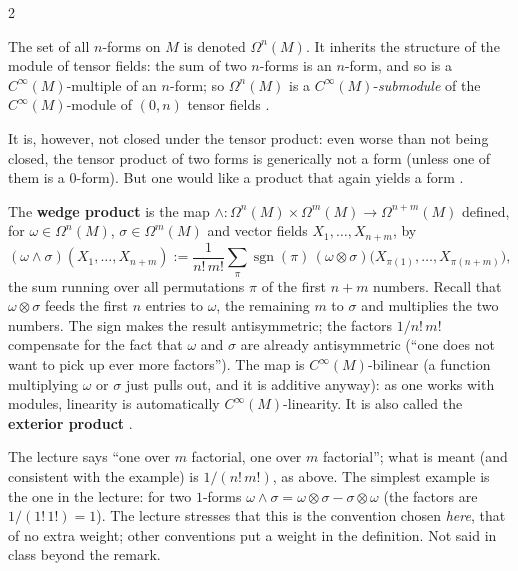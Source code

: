 \begin{paracol}{2}
\begin{definition}\label{def:gr-omega-n}
The set of all $n$-forms on $M$ is denoted $\Omega^n(M)$. It inherits the structure of the module of tensor fields: the sum of two $n$-forms is an $n$-form, and so is a $C^\infty(M)$-multiple of an $n$-form; so $\Omega^n(M)$ is a $C^\infty(M)$-\emph{submodule} of the $C^\infty(M)$-module of $(0,n)$ tensor fields     .
\end{definition}
It is, however, not closed under the tensor product: even worse than not being closed, the tensor product of two forms is generically not a form (unless one of them is a $0$-form). But one would like a product that again yields a form   .

\begin{definition}\label{def:gr-wedge}
The \textbf{wedge product} is the map $\wedge\colon\Omega^n(M)\times\Omega^m(M)\to\Omega^{n+m}(M)$ defined, for $\omega\in\Omega^n(M)$, $\sigma\in\Omega^m(M)$ and vector fields $X_1,\dots,X_{n+m}$, by
\[
  (\omega\wedge\sigma)(X_1,\dots,X_{n+m}):=\frac1{n!\,m!}\sum_{\pi}\operatorname{sgn}(\pi)\,(\omega\otimes\sigma)\bigl(X_{\pi(1)},\dots,X_{\pi(n+m)}\bigr),
\]
the sum running over all permutations $\pi$ of the first $n+m$ numbers. Recall that $\omega\otimes\sigma$ feeds the first $n$ entries to $\omega$, the remaining $m$ to $\sigma$ and multiplies the two numbers. The sign makes the result antisymmetric; the factors $1/n!\,m!$ compensate for the fact that $\omega$ and $\sigma$
are already antisymmetric (``one does not want to pick up ever more factors''). The map is $C^\infty(M)$-bilinear (a function multiplying $\omega$ or $\sigma$ just pulls out, and it is additive anyway): as one works with modules, linearity is automatically $C^\infty(M)$-linearity. It is also called the \textbf{exterior product}           .
\end{definition}
\begin{coursenote}
The lecture says ``one over $m$ factorial, one over $m$ factorial''; what is meant (and consistent with the example) is $1/(n!\,m!)$, as above. The simplest example is the one in the lecture: for two $1$-forms $\omega\wedge\sigma=\omega\otimes\sigma-\sigma\otimes\omega$ (the factors are $1/(1!\,1!)=1$). The lecture stresses that this is the convention chosen \emph{here}, that of
no extra weight; other conventions put a weight in the definition. Not said in class beyond the remark.  
\end{coursenote}


\end{paracol}
